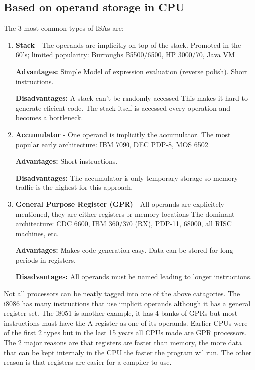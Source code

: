 \documentclass[12pt]{report}
\begin{document}
 \subsection{Based on operand storage in CPU}
 The 3 most common types of ISAs are:
\begin{enumerate}
\item \textbf{Stack} - The operands are implicitly on top of the stack.
Promoted in the 60’s; limited popularity: Burroughs B5500/6500, HP
3000/70, Java VM

\textbf{Advantages:} Simple Model of expression evaluation (reverse polish). Short instructions.

\textbf{Disadvantages:} A stack can't be randomly accessed This makes it hard to generate eficient code. The stack itself is accessed every operation and becomes a bottleneck.

\item \textbf{Accumulator} - One operand is implicitly the accumulator.
The most popular early architecture: IBM 7090, DEC PDP-8, MOS 6502

\textbf{Advantages:} Short instructions.
 
\textbf{Disadvantages:} The accumulator is only temporary storage so memory traffic is the highest for this approach.

\item \textbf{General Purpose Register (GPR)} - All operands are explicitely mentioned, they are either registers or memory locations
The dominant architecture: CDC 6600, IBM
360/370 (RX), PDP-11, 68000, all RISC
machines, etc.

\textbf{Advantages:} Makes code generation easy. Data can be stored for long periods in registers.

\textbf{Disadvantages:} All operands must be named leading to longer instructions.
\end{enumerate} 

Not all processors can be neatly tagged into one of the above catagories. The i8086 has many instructions that use implicit operands although it has a general register set. The i8051 is another example, it has 4 banks of GPRs but most instructions must have the A register as one of its operands. Earlier CPUs were of the first 2 types but in the last 15 years all CPUs made are GPR processors. The 2 major reasons are that registers are faster than memory, the more data that can be kept internaly in the CPU the faster the program wil run. The other reason is that registers are easier for a compiler to use.
\end{document}
